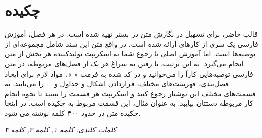
\section*{چکیده}
\vspace{2cm}

\large
قالب حاضر، برای تسهیل در نگارش متن در بستر
تهیه شده است. 
در هر فصل، آموزش فارسی یک سری از کارهای
ارائه شده است. در واقع متن این سند شامل مجموعه‌ای از توصیه‌ها است. اما آموزش اصلی با رجوع شما به اسکریپت تولیدکننده هر بخش از متن انجام می‌گیرد. به این ترتیب، با رفتن به سراغ هر یک از فصل‌های مربوطه، در متن فارسی توصیه‌هایی کارآ را می‌خوانید و در کد
شده به فرمت «
»، مواد لازم برای ایجاد فصل‌بندی، فهرست‌های مختلف، قراردادن اشکال و جداول و ... را می‌یابید. به قسمت‌های مختلف این نوشتار رجوع کنید و اسکریپت هر قسمت را ببینید تا نحوه انجام کار مربوطه دستتان بیایبد. به عنوان مثال، این قسمت مربوط به چکیده است.
در اینجا چکیده متن در حدود ۳۰۰ کلمه نوشته می شود. 
\\

\vspace{2cm}

\noindent \textit{
 کلمات کلیدی:
 کلمه ۱,
  کلمه ۲,
  کلمه ۳}